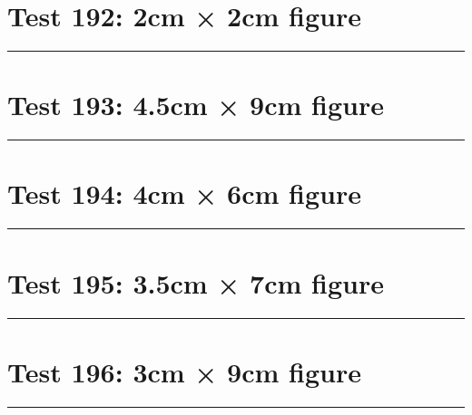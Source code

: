 \documentclass[a4paper,11pt]{article}
\begin{document}
\section*{Test 192: 2cm × 2cm figure}
\begin{swarmwrap}%
  \begin{minipage}[t]{2cm}
    \centering
    \rule{\linewidth}{2cm}
  \end{minipage}%
\end{swarmwrap}%
\swarmwrapnext
\lipsum[34]
\lipsum[35]
\lipsum[36]
\lipsum[37]
\lipsum[38]
\section*{Test 193: 4.5cm × 9cm figure}
\begin{swarmwrap}%
  \begin{minipage}[t]{4cm}
    \centering
    \rule{\linewidth}{9cm}
  \end{minipage}%
\end{swarmwrap}%
\swarmwrapnext
\lipsum[5]
\lipsum[6]
\lipsum[7]
\section*{Test 194: 4cm × 6cm figure}
\begin{swarmwrap}%
  \begin{minipage}[t]{4cm}
    \centering
    \rule{\linewidth}{6cm}
  \end{minipage}%
\end{swarmwrap}%
\swarmwrapnext
\lipsum[124]
\lipsum[125]
\lipsum[126]
\lipsum[127]
\lipsum[128]
\lipsum[129]
\section*{Test 195: 3.5cm × 7cm figure}
\begin{swarmwrap}%
  \begin{minipage}[t]{3cm}
    \centering
    \rule{\linewidth}{7cm}
  \end{minipage}%
\end{swarmwrap}%
\swarmwrapnext
\lipsum[15]
\lipsum[16]
\lipsum[17]
\lipsum[18]
\section*{Test 196: 3cm × 9cm figure}
\begin{swarmwrap}%
  \begin{minipage}[t]{3cm}
    \centering
    \rule{\linewidth}{9cm}
  \end{minipage}%
\end{swarmwrap}%
\swarmwrapnext
\lipsum[18]
\lipsum[19]
\lipsum[20]
\end{document}
